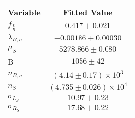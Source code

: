 \begin{tabular}[t]{lc}
\hline
Variable &Fitted Value\\
\hline\hline
$f_{\frac{L}{R}}$&$0.417\pm0.021$\\
\hline
$\lambda_{B,c}$&$-0.00186\pm0.00030$\\
\hline
$\mu_S$&$5278.866\pm0.080$\\
\hline
B&$1056\pm42$\\
\hline
$n_{B,c}$&$(4.14\pm0.17)\times 10^3$\\
\hline
$n_S$&$(4.735\pm0.026)\times 10^4$\\
\hline
$\sigma_{L_S}$&$10.97\pm0.23$\\
\hline
$\sigma_{R_S}$&$17.68\pm0.22$\\
\hline
\end{tabular}